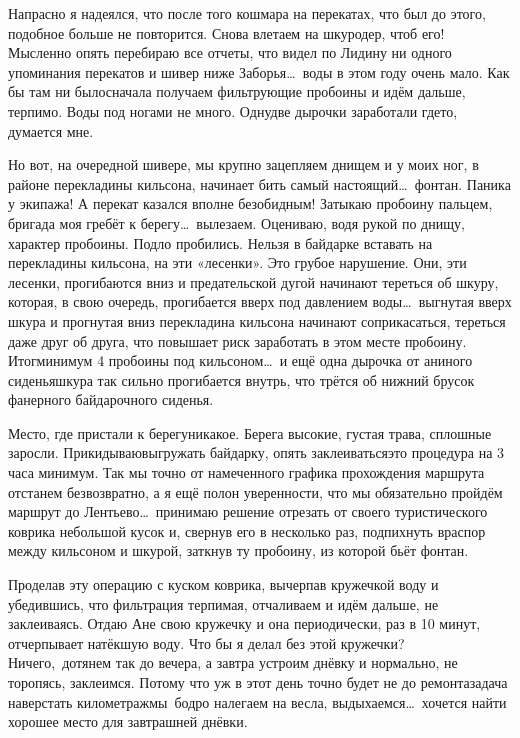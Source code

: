 Напрасно я надеялся, что после того кошмара на перекатах, что был до этого, подобное больше не повторится. Снова влетаем на шкуродер, чтоб его! Мысленно опять перебираю все отчеты, что видел по Лиди\mdash ну ни одного упоминания перекатов и шивер ниже Заборья\ldots~воды в этом году очень мало. Как бы там ни было\mdash сначала получаем фильтрующие пробоины и идём дальше, терпимо. Воды под ногами не много. Одну\sdash две дырочки заработали где\sdash то, думается мне. 

Но вот, на очередной шивере, мы крупно зацепляем днищем и у моих ног, в районе перекладины кильсона, начинает бить самый настоящий\ldots~фонтан. Паника у экипажа! А перекат казался вполне безобидным! Затыкаю пробоину пальцем, бригада моя гребёт к берегу\ldots~вылезаем. Оцениваю, водя рукой по днищу, характер пробоины. Подло пробились. Нельзя в байдарке вставать на перекладины кильсона, на эти «лесенки». Это грубое нарушение. Они, эти лесенки, прогибаются вниз и предательской дугой начинают тереться об шкуру, которая, в свою очередь, прогибается вверх под давлением воды\ldots~выгнутая вверх шкура и прогнутая вниз перекладина кильсона начинают соприкасаться, тереться даже друг об друга, что повышает риск заработать в этом месте пробоину. Итог\mdash минимум 4 пробоины под кильсоном\ldots~и ещё одна дырочка от аниного сиденья\mdash шкура так сильно прогибается внутрь, что трётся об нижний брусок фанерного байдарочного сиденья. 

Место, где пристали к берегу\mdash никакое. Берега высокие, густая трава, сплошные заросли. Прикидываю\mdash выгружать байдарку, опять заклеиваться\mdash это процедура на 3 часа минимум. Так мы точно от намеченного графика прохождения маршрута отстанем безвозвратно, а я ещё полон уверенности, что мы обязательно пройдём маршрут до Лентьево\ldots~принимаю решение отрезать от своего туристического коврика небольшой кусок и, свернув его в несколько раз, подпихнуть враспор между кильсоном и шкурой, заткнув ту пробоину, из которой бьёт фонтан. 

Проделав эту операцию с куском коврика, вычерпав кружечкой воду и убедившись, что фильтрация терпимая, отчаливаем и идём дальше, не заклеиваясь. Отдаю Ане свою кружечку и она периодически, раз в 10 минут, отчерпывает натёкшую воду. Что бы я делал без этой кружечки? Ничего,~дотянем так до вечера, а завтра устроим днёвку и нормально, не торопясь, заклеимся. Потому что уж в этот день точно будет не до ремонта\mdash задача наверстать километраж\mdash мы~бодро налегаем на весла, выдыхаемся\ldots~хочется найти хорошее место для завтрашней днёвки.

